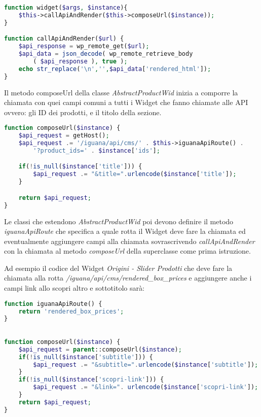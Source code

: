 \begin{lstlisting}[style=customphp, language=Php,caption={I metodi widget e \emph{callApiAndRender} di \emph{AbstractProductWid}}] 
function widget($args, $instance){
	$this->callApiAndRender($this->composeUrl($instance));
}

function callApiAndRender($url) {
	$api_response = wp_remote_get($url);
	$api_data = json_decode( wp_remote_retrieve_body
		( $api_response ), true );
	echo str_replace('\n','',$api_data['rendered_html']);
}
\end{lstlisting}

Il metodo composeUrl della classe \emph{AbstractProductWid} inizia a comporre la chiamata con quei campi
comuni a tutti i Widget che fanno chiamate alle API ovvero: gli ID dei prodotti, e il titolo della sezione.

\begin{lstlisting}[style=customphp, language=Php,caption={Il metodo \emph{composeUrl} di \emph{AbstractProductWid}}] 
function composeUrl($instance) {
    $api_request = getHost();
    $api_request .= '/iguana/api/cms/' . $this->iguanaApiRoute() . 
    	'?product_ids=' . $instance['ids'];

    if(!is_null($instance['title'])) {
        $api_request .= "&title=".urlencode($instance['title']);
    }

    return $api_request;
}

\end{lstlisting}

Le classi che estendono \emph{AbstractProductWid} poi devono definire il metodo \emph{iguanaApiRoute} che specifica
a quale rotta il Widget deve fare la chiamata ed eventualmente aggiungere campi alla chiamata sovrascrivendo \emph{callApiAndRender} con la 
chiamata al metodo \emph{composeUrl} della superclasse come prima istruzione.

Ad esempio il codice del Widget \emph{Origini - Slider Prodotti} che deve fare la chiamata alla rotta \emph{/iguana/api/cms/rendered\_box\_prices} e aggiungere  anche i campi link allo scopri altro e sottotitolo sarà:

\begin{lstlisting}[style=customphp, language=Php,caption={Viene sovrascritto \emph{iguanaApiRoute} da \emph{ProductsWidget} per specificare la chiamata da effettuare}] 
function iguanaApiRoute() {
    return 'rendered_box_prices';
}
\end{lstlisting}

\begin{lstlisting}[style=customphp, language=Php,caption={Ridefinendo \emph{composeUrl} vengono aggiunti ulteriori campi specifici del Widget \emph{ProductsWidget}}] 

function composeUrl($instance) {
    $api_request = parent::composeUrl($instance);
    if(!is_null($instance['subtitle'])) {
        $api_request .= "&subtitle=".urlencode($instance['subtitle']);
    }
    if(!is_null($instance['scopri-link'])) {
        $api_request .= "&link=". urlencode($instance['scopri-link']);
    }
    return $api_request;
}
\end{lstlisting}

